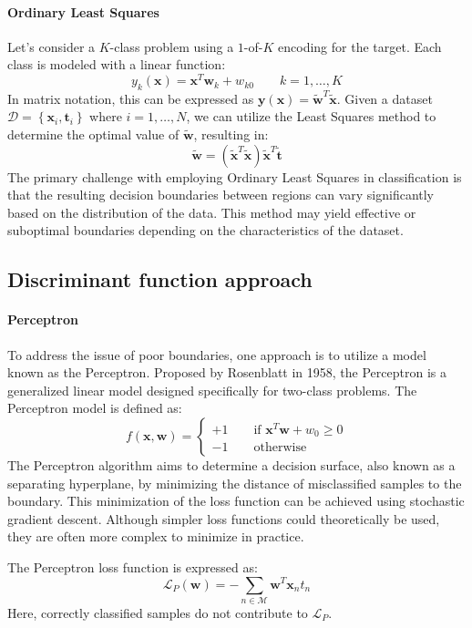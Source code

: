 \paragraph*{Ordinary Least Squares}
Let's consider a $K$-class problem using a $1$-of-$K$ encoding for the target. 
Each class is modeled with a linear function:
\[y_k(\textbf{x})=\textbf{x}^T\textbf{w}_k+w_{k0} \qquad k=1,\dots,K\]
In matrix notation, this can be expressed as $\textbf{y}(\textbf{x})=\tilde{\textbf{w}}^T\tilde{\textbf{x}}$. 
Given a dataset $\mathcal{D}=\left\{ \textbf{x}_i, \textbf{t}_i  \right\}$ where $i=1,\dots,N$, we can utilize the Least Squares method to determine the optimal value of $\tilde{\textbf{w}}$, resulting in:
\[\tilde{\textbf{w}}=\left(\tilde{\textbf{x}}^T\tilde{\textbf{x}}\right)\tilde{\textbf{x}}^T\tilde{\textbf{t}}\]
The primary challenge with employing Ordinary Least Squares in classification is that the resulting decision boundaries between regions can vary significantly based on the distribution of the data. 
This method may yield effective or suboptimal boundaries depending on the characteristics of the dataset.

\subsection{Discriminant function approach}
\paragraph*{Perceptron}
To address the issue of poor boundaries, one approach is to utilize a model known as the Perceptron. 
Proposed by Rosenblatt in 1958, the Perceptron is a generalized linear model designed specifically for two-class problems. 
The Perceptron model is defined as:
\[f(\textbf{x},\textbf{w})=\begin{cases}
    +1 \qquad \text{if } \textbf{x}^T\textbf{w}+w_0 \geq 0 \\
    -1 \qquad \text{otherwise}
\end{cases}\]
The Perceptron algorithm aims to determine a decision surface, also known as a separating hyperplane, by minimizing the distance of misclassified samples to the boundary. 
This minimization of the loss function can be achieved using stochastic gradient descent.
Although simpler loss functions could theoretically be used, they are often more complex to minimize in practice. 

The Perceptron loss function is expressed as:
\[\mathcal{L}_P(\textbf{w})=-\sum_{n \in \mathcal{M}}\textbf{w}^T\textbf{x}_nt_n\]
Here, correctly classified samples do not contribute to $\mathcal{L}_P$. 

